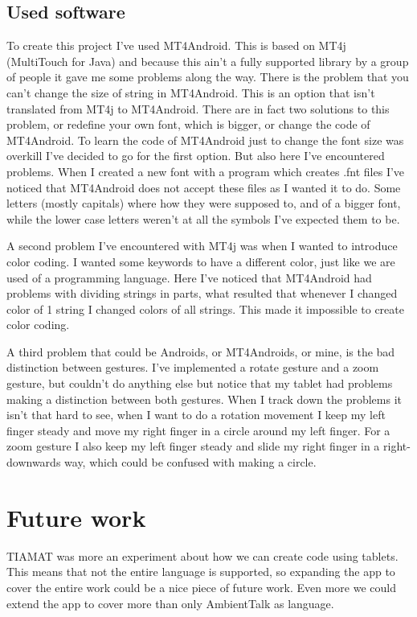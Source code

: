 \documentclass[a4paper,12pt]{report}
\begin{document}
\subsection{Used software}
To create this project I've used MT4Android. This is based on MT4j (MultiTouch for Java) and because this ain't a fully supported library by a group of people it gave me some problems along the way. There is the problem that 
you can't change the size of string in MT4Android. This is an option that isn't translated from MT4j to MT4Android. There are in fact two solutions to this problem, or redefine your own font, which is bigger, or change the 
code of MT4Android. To learn the code of MT4Android just to change the font size was overkill I've decided to go for the first option. But also here I've encountered problems. When I created a new font with a program which
creates .fnt files I've noticed that MT4Android does not accept these files as I wanted it to do. Some letters (mostly capitals) where how they were supposed to, and of a bigger font, while the lower case letters weren't 
at all the symbols I've expected them to be.

A second problem I've encountered with MT4j was when I wanted to introduce color coding. I wanted some keywords to have a different color, just like we are used of a programming language. Here I've noticed that
MT4Android had problems with dividing strings in parts, what resulted that whenever I changed color of 1 string I changed colors of all strings. This made it impossible to create color coding.

A third problem that could be Androids, or MT4Androids, or mine, is the bad distinction between gestures. I've implemented a rotate gesture and a zoom gesture, but couldn't do anything else but notice that
my tablet had problems making a distinction between both gestures. When I track down the problems it isn't that hard to see, when I want to do a rotation movement I keep my left finger steady and move my right finger in a
circle around my left finger. For a zoom gesture I also keep my left finger steady and slide my right finger in a right-downwards way, which could be confused with making a circle.

\section{Future work}
TIAMAT was more an experiment about how we can create code using tablets. This means that not the entire language is supported, so expanding the app to cover the entire work could be a nice piece of future work. Even more
we could extend the app to cover more than only AmbientTalk as language. 
\end{document}
